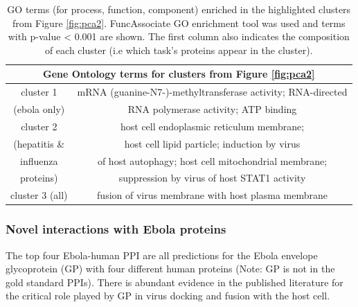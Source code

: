 \documentclass{bioinfo}
\begin{document}
\begin{table}[bht]
\begin{scriptsize}
\begin{center}
\begin{tabular}{|c|c|}
\multicolumn{2}{c}{Gene Ontology terms for clusters from Figure \ref{fig:pca2}} \\ \hline
cluster 1 & mRNA (guanine-N7-)-methyltransferase activity; RNA-directed \\
(ebola only)& RNA polymerase activity; ATP binding \\ \hline
cluster 2 & host cell endoplasmic reticulum membrane; \\ 
(hepatitis \& & host cell lipid particle; induction by virus \\
influenza & of host autophagy; host cell mitochondrial membrane; \\
proteins) & suppression by virus of host STAT1 activity \\ \hline
cluster 3 (all) & fusion of virus membrane with host plasma membrane \\ \hline
\end{tabular}
\caption{GO terms (for process, function, component) enriched in the highlighted clusters from Figure \ref{fig:pca2}. FuncAssociate GO enrichment tool was used and terms with p-value < 0.001 are shown. The first column also indicates the composition of each cluster (i.e which task's proteins appear in the cluster).}
\label{goterms}
\end{center}
\end{scriptsize}
\end{table}

 


\subsubsection{Novel interactions with Ebola proteins}
The top four Ebola-human PPI are all predictions for the Ebola envelope glycoprotein (GP) with four different human proteins (Note: GP is not in the gold standard PPIs). There is abundant evidence in the published literature \citep{nanbo2010} for the critical role played by GP in virus docking and fusion with the host cell.
\end{document}
